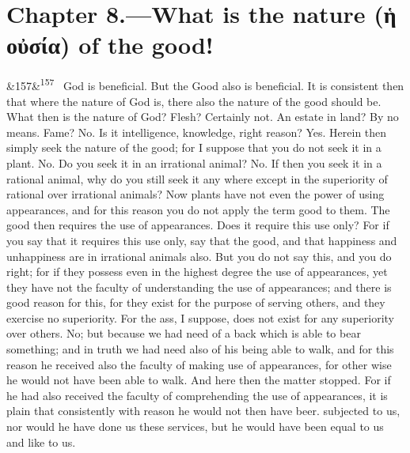 \documentclass[12pt]{article}
\newcommand{\para}[1][]{\par\noindent\ifx&#1&\else\textsuperscript{\footnotesize #1}~\fi}
\begin{document}
\section*{Chapter 8.---What is the nature (ἡ οὐσία) of the good!}

\para[157] God is beneficial. But the Good also is beneficial. It is consistent then that where the nature of God is, there also the nature of the good should be. What then is the nature of God? Flesh? Certainly not. An estate in land? By no means. Fame? No. Is it intelligence, knowledge, right reason? Yes. Herein then simply seek the nature of the good; for I suppose that you do not seek it in a plant. No. Do you seek it in an irrational animal? No. If then you seek it in a rational animal, why do you still seek it any where except in the superiority of rational over irrational animals? Now plants have not even the power of using appearances, and for this reason you do not apply the term good to them. The good then requires the use of appearances. Does it require this use only? For if you say that it requires this use only, say that the good, and that happiness and unhappiness are in irrational animals also. But you do not say this, and you do right; for if they possess even in the highest degree the use of appearances, yet they have not the faculty of understanding the use of appearances; and there is good reason for this, for they exist for the purpose of serving others, and they exercise no superiority. For the ass, I suppose, does not exist for any superiority over others. No; but because we had need of a back which is able to bear something; and in truth we had need also of his being able to walk, and for this reason he received also the faculty of making use of appearances, for other wise he would not have been able to walk. And here then the matter stopped. For if he had also received the faculty of comprehending the use of appearances, it is plain that consistently with reason he would not then have beer. subjected to us, nor would he have done us these services, but he would have been equal to us and like to us.
\end{document}
